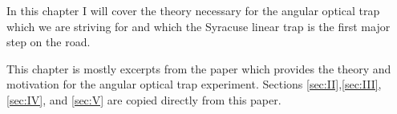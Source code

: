 In this chapter I will cover the theory necessary for the angular optical trap
which we are striving for and which the Syracuse linear trap is the first major
step on the road.

This chapter is mostly excerpts from the paper which provides the theory and
motivation for the angular optical trap experiment.\cite{PhysRevD.89.122002}
Sections \ref{sec:II},\ref{sec:III},\ref{sec:IV}, and \ref{sec:V} are copied
directly from this paper.








